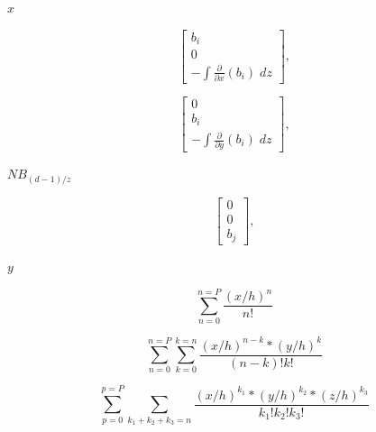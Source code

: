 \documentclass{article}
\begin{document}
$x$
\pagebreak

\[\begin{bmatrix}b_i\\ 0 \\-\int \frac{\partial}{\partial x}(b_i)\; dz\end{bmatrix},\]
\pagebreak

\[\begin{bmatrix}0\\ b_i \\-\int \frac{\partial}{\partial y}(b_i)\; dz\end{bmatrix},\]
\pagebreak

$NB_{(d-1)/z}$
\pagebreak

\[\begin{bmatrix}0\\0\\b_j\end{bmatrix},\]
\pagebreak

$y$
\pagebreak

\[\sum_{n=0}^{n=P} \frac{(x/h)^n}{n!}\]
\pagebreak

\[\sum_{n=0}^{n=P} \sum_{k=0}^{k=n} \frac{(x/h)^{n-k}*(y/h)^k}{(n-k)!k!}\]
\pagebreak

\[\sum_{p=0}^{p=P} \sum_{k_1+k_2+k_3=n} \frac{(x/h)^{k_1}*(y/h)^{k_2}*(z/h)^{k_3}}{k_1!k_2!k_3!}\]
\pagebreak
\end{document}

